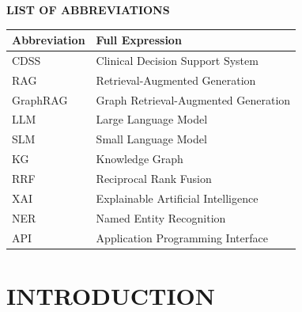 \documentclass[a4paper,12pt,oneside]{report}
\theoremstyle{definition}
\begin{document}
\renewcommand{\listtablename}{LIST OF TABLES}
{\let\oldnumberline\numberline
\renewcommand{\numberline}{Table~\oldnumberline}
\listoftables}

\glsaddall 
\renewcommand*{\acronymname}{LIST OF ABBREVIATIONS}
\renewcommand*{\entryname}{Abbreviation}
\renewcommand*{\descriptionname}{Full Expression}
\begin{center}
    \Large{\textbf{LIST OF ABBREVIATIONS}}
\end{center}
\begin{longtable}{p{3cm}p{10cm}}
\textbf{Abbreviation} & \textbf{Full Expression} \\ \hline
CDSS & Clinical Decision Support System \\
RAG & Retrieval-Augmented Generation \\
GraphRAG & Graph Retrieval-Augmented Generation \\
LLM & Large Language Model \\
SLM & Small Language Model \\
KG & Knowledge Graph \\
RRF & Reciprocal Rank Fusion \\
XAI & Explainable Artificial Intelligence \\
NER & Named Entity Recognition \\
API & Application Programming Interface \\
\end{longtable}

% 

% 


\newpage
{}

\pagestyle{fancy}
\fancyhf{}
\fancyhead[L]{\leftmark}
\fancyfoot[R]{\thepage}

\chapter{INTRODUCTION}
\label{chapter:Introduction}

\newpage
\end{document}
